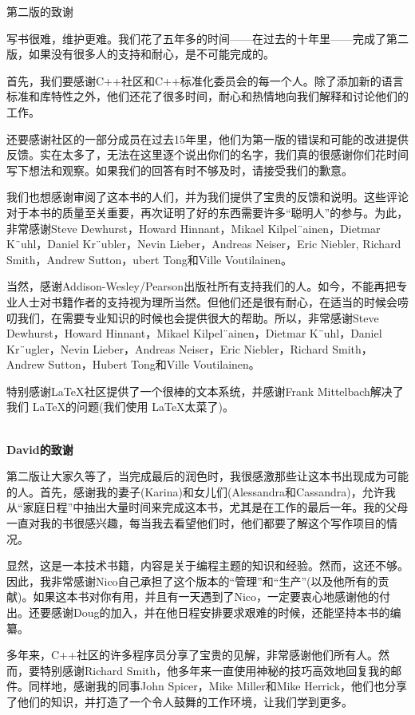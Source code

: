 \begin{flushright}
 第二版的致谢
\end{flushright}

写书很难，维护更难。我们花了五年多的时间——在过去的十年里——完成了第二版，如果没有很多人的支持和耐心，是不可能完成的。

首先，我们要感谢C++社区和C++标准化委员会的每一个人。除了添加新的语言标准和库特性之外，他们还花了很多时间，耐心和热情地向我们解释和讨论他们的工作。

还要感谢社区的一部分成员在过去15年里，他们为第一版的错误和可能的改进提供反馈。实在太多了，无法在这里逐个说出你们的名字，我们真的很感谢你们花时间写下想法和观察。如果我们的回答有时不够及时，请接受我们的歉意。

我们也想感谢审阅了这本书的人们，并为我们提供了宝贵的反馈和说明。这些评论对于本书的质量至关重要，再次证明了好的东西需要许多“聪明人”的参与。为此，非常感谢Steve Dewhurst，Howard Hinnant，Mikael Kilpel¨ainen，Dietmar K¨uhl，Daniel Kr¨ubler，Nevin Lieber，Andreas Neiser，Eric Niebler, Richard Smith，Andrew Sutton，ubert Tong和Ville Voutilainen。

当然，感谢Addison-Wesley/Pearson出版社所有支持我们的人。如今，不能再把专业人士对书籍作者的支持视为理所当然。但他们还是很有耐心，在适当的时候会唠叨我们，在需要专业知识的时候也会提供很大的帮助。所以，非常感谢Steve Dewhurst，Howard Hinnant，Mikael Kilpel¨ainen，Dietmar K¨uhl，Daniel Kr¨ugler，Nevin Lieber，Andreas Neiser，Eric Niebler，Richard Smith，Andrew Sutton，Hubert Tong和Ville Voutilainen。

特别感谢LaTeX社区提供了一个很棒的文本系统，并感谢Frank Mittelbach解决了我们 \LaTeX 的问题(我们使用 \LaTeX 太菜了)。

\hspace*{\fill} \\ %
\noindent\textbf{David的致谢}

第二版让大家久等了，当完成最后的润色时，我很感激那些让这本书出现成为可能的人。首先，感谢我的妻子(Karina)和女儿们(Alessandra和Cassandra)，允许我从“家庭日程”中抽出大量时间来完成这本书，尤其是在工作的最后一年。我的父母一直对我的书很感兴趣，每当我去看望他们时，他们都要了解这个写作项目的情况。

显然，这是一本技术书籍，内容是关于编程主题的知识和经验。然而，这还不够。因此，我非常感谢Nico自己承担了这个版本的“管理”和“生产”(以及他所有的贡献)。如果这本书对你有用，并且有一天遇到了Nico，一定要衷心地感谢他的付出。还要感谢Doug的加入，并在他日程安排要求艰难的时候，还能坚持本书的编纂。

多年来，C++社区的许多程序员分享了宝贵的见解，非常感谢他们所有人。然而，要特别感谢Richard Smith，他多年来一直使用神秘的技巧高效地回复我的邮件。同样地，感谢我的同事John Spicer，Mike Miller和Mike Herrick，他们也分享了他们的知识，并打造了一个令人鼓舞的工作环境，让我们学到更多。

